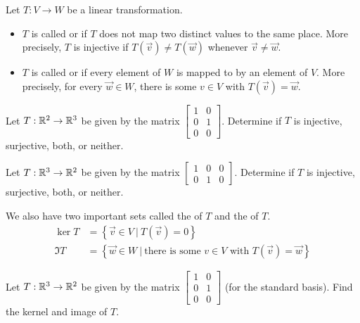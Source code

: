 
\begin{applicationActivities}{2}{18}

\begin{definition}
Let $T: V \rightarrow W$ be a linear transformation.
\begin{itemize}
\item $T$ is called  or  if $T$ does not map two distinct values to the same place.  More precisely, $T$ is injective if $T(\vec{v}) \neq T(\vec{w})$ whenever $\vec{v} \neq \vec{w}$.
\item $T$ is called  or  if every element of $W$ is mapped to by an element of $V$.  More precisely, for every $\vec{w} \in W$, there is some $v \in V$ with $T(\vec{v})=\vec{w}$.
\end{itemize}
\end{definition}

\begin{activity}{5}
Let $T: \mathbb{R}^2 \rightarrow \mathbb{R}^3$ be given by the matrix $\begin{bmatrix} 1 & 0 \\ 0 & 1 \\ 0 & 0 \end{bmatrix}$.  Determine if $T$ is injective, surjective, both, or neither.
\end{activity}

\begin{activity}{5}
Let $T: \mathbb{R}^3 \rightarrow \mathbb{R}^2$ be given by the matrix $\begin{bmatrix} 1 & 0 &0  \\ 0 & 1 & 0 \end{bmatrix}$.  Determine if $T$ is injective, surjective, both, or neither.
\end{activity}

\begin{definition}
We also have two important sets called the  of $T$ and the  of $T$.
\begin{align*}
\ker T &= \left\{ \vec{v} \in V\ \big|\ T(\vec{v})=0\right\} \\
\Im T &= \left\{ \vec{w} \in W\ \big|\ \text{there is some }v\in V \text{ with } T(\vec{v})=\vec{w}\right\}
\end{align*}
\end{definition}

\begin{activity}{5}
Let $T: \mathbb{R}^3 \rightarrow \mathbb{R}^2$ be given by the matrix $\begin{bmatrix} 1 & 0 \\ 0 & 1 \\ 0 & 0 \end{bmatrix}$ (for the standard basis).  Find the kernel and image of $T$.
\end{activity}


\end{applicationActivities}
